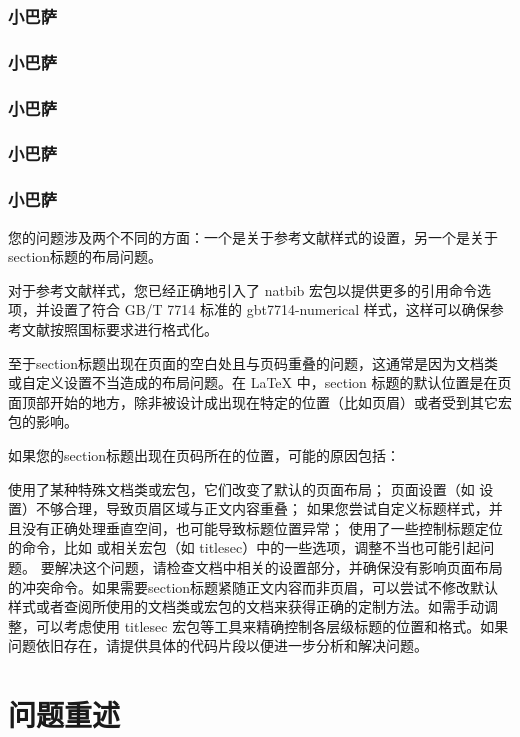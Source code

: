 \documentclass[a4paper]{ctexart}
\begin{document}
\subsubsection{小巴萨}
\subsubsection{小巴萨}
\subsubsection{小巴萨}
\subsubsection{小巴萨}
\subsubsection{小巴萨}




您的问题涉及两个不同的方面：一个是关于参考文献样式的设置，另一个是关于section标题的布局问题。

对于参考文献样式，您已经正确地引入了 natbib 宏包以提供更多的引用命令选项，并设置了符合 GB/T 7714 标准的 gbt7714-numerical 样式，这样可以确保参考文献按照国标要求进行格式化。

至于section标题出现在页面的空白处且与页码重叠的问题，这通常是因为文档类或自定义设置不当造成的布局问题。在 LaTeX 中，section 标题的默认位置是在页面顶部开始的地方，除非被设计成出现在特定的位置（比如页眉）或者受到其它宏包的影响。

如果您的section标题出现在页码所在的位置，可能的原因包括：

使用了某种特殊文档类或宏包，它们改变了默认的页面布局；
页面设置（如  设置）不够合理，导致页眉区域与正文内容重叠；
如果您尝试自定义标题样式，并且没有正确处理垂直空间，也可能导致标题位置异常；
使用了一些控制标题定位的命令，比如  或相关宏包（如 titlesec）中的一些选项，调整不当也可能引起问题。
要解决这个问题，请检查文档中相关的设置部分，并确保没有影响页面布局的冲突命令。如果需要section标题紧随正文内容而非页眉，可以尝试不修改默认样式或者查阅所使用的文档类或宏包的文档来获得正确的定制方法。如需手动调整，可以考虑使用 titlesec 宏包等工具来精确控制各层级标题的位置和格式。如果问题依旧存在，请提供具体的代码片段以便进一步分析和解决问题。

\section{问题重述}
\end{document}
